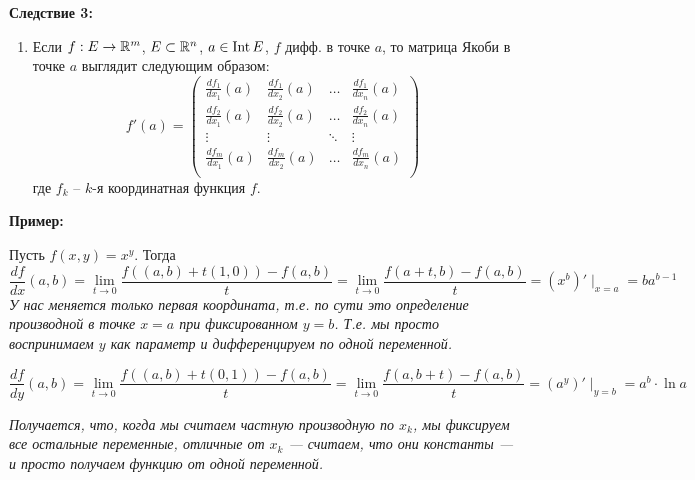 \textbf{Следствие 3:}
\begin{enumerate}
    \item[] 
    Если $f : E \to \mathbb{R}^m$, $E \subset \mathbb{R}^n$, $a \in \operatorname{Int} E$,
    $f$ дифф. в точке $a$, то матрица Якоби в точке $a$
    выглядит следующим образом:
    $$ f'(a) =
    \begin{pmatrix*}
        \frac{df_1}{dx_1}(a) & \frac{df_1}{dx_2}(a) &
        \dots & \frac{df_1}{dx_n}(a) \\
        \frac{df_2}{dx_1}(a) & \frac{df_2}{dx_2}(a) &
        \dots & \frac{df_2}{dx_n}(a) \\
        \vdots & \vdots & \ddots & \vdots \\
        \frac{df_m}{dx_1}(a) & \frac{df_m}{dx_2}(a) &
        \dots & \frac{df_m}{dx_n}(a) \\
    \end{pmatrix*}$$
    где $f_k$ -- $k$-я координатная функция $f$.
\end{enumerate}

\textbf{Пример:}

Пусть $f(x, y) = x^y$. Тогда
$$
\frac{df}{dx}(a, b) = 
\lim_{t \to 0} \frac{f((a, b) + t(1, 0)) - f(a, b)}{t} =
\lim_{t \to 0} \frac{f(a + t, b) - f(a, b)}{t} =
(x^b)' \mid_{x = a} = b a^{b-1}
$$
\textit{У нас меняется только первая координата,
т.е. по сути это определение производной в точке $x = a$ при
фиксированном $y = b$. Т.е. мы просто воспринимаем $y$ как параметр
и дифференцируем по одной переменной.}

$$
\frac{df}{dy}(a, b) = 
\lim_{t \to 0} \frac{f((a, b) + t(0, 1)) - f(a, b)}{t} =
\lim_{t \to 0} \frac{f(a, b + t) - f(a, b)}{t} =
(a^y)' \mid_{y = b} = a^b \cdot \ln a
$$

\textit{Получается, что, когда мы считаем частную производную по $x_k$,
мы фиксируем все остальные переменные, отличные от $x_k$ ---
считаем, что они константы ---
и просто получаем функцию от одной переменной.}
